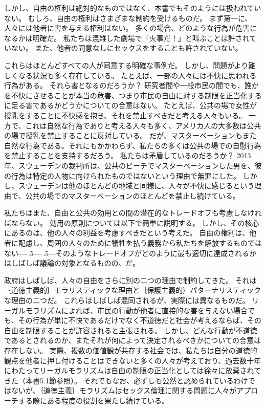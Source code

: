 \documentclass[paper=a4,book,openany]{jlreq}
\def\DDASH{―\kern-.5\zw―\kern-.5\zw―} %
\begin{document}
しかし、自由の権利は絶対的なものではなく、本書でもそのようには扱われていない。
むしろ、自由の権利はさまざまな制約を受けるものだ。
まず第一に、人々には他者に害を与える権利はない。
多くの場合、どのような行為が危害になるかは明確だ。
私たちは混雑した劇場で「火事だ！」と叫ぶことは許されていない。
また、他者の同意なしにセックスをすることも許されていない。

これらはほとんどすべての人が同意する明確な事例だ。
しかし、問題がより難しくなる状況も多く存在している。
たとえば、一部の人々には不快に思われる行為がある。
それら害となるのだろうか？ 研究者間や一般市民の間でも、誰かを不快にさせることが本当の危害、つまり市民の自由に対する制限を正当化するに足る害であるかどうかについての合意はない。
たとえば、公共の場で女性が授乳をすることに不快感を抱き、それを禁止すべきだと考える人々もいる。
一方で、これは自然な行為でありと考える人々も多く、アメリカ人の大多数は公共の場で授乳を禁止することに反対している\citep{cdc08:_public_opinion_breas}。
だが、マスターベーションもまた自然な行為である。それにもかかわらず、私たちの多くは公共の場での自慰行為を禁止することを支持するだろう。
私たちは矛盾しているのだろうか？ 2013年、スウェーデンの裁判所は、公共のビーチでマスターベーションした男を、彼の行為は特定の人物に向けられたものではないという理由で無罪にした\citep{ederyd13:_you_cant_just_walk_aroun}。
しかし、スウェーデンは他のほとんどの地域と同様に、人々が不快に感じるという理由で、公共の場でのマスターベーションのほとんどを禁止し続けている。

私たちはまた、自由と公共の効用との間の潜在的なトレードオフも考慮しなければならない。
効用の原則については以下で簡単に説明する。
しかし、その核心にあるのは、他の人々の利益を考慮すべきだという考えだ。
自由の権利は、他者に配慮し、周囲の人々のために犠牲を払う義務から私たちを解放するものではない{\DDASH}そのようなトレードオフがどのように最も適切に達成されるかはしばしば議論の対象となるものの、だ。

政府はしばしば、人々の自由をさらに別の二つの理由で制約してきた。
それは｛道徳主義的｝{モラリスティック}な理由と｛保護主義的｝{パターナリスティック}な理由の二つだ。
これらはしばしば混同されるが、実際には異なるものだ。
リーガルモラリズムによれば、市民の行動が他者に直接的な害を与えない場合でも、その行為が単に不快であるだけでなく不道徳だと社会が考えるならば、その自由を制限することが許容されると主張される。
しかし、どんな行動が不道徳であるとされるのか、またそれが何によって決定されるべきかについての合意は存在しない。
実際、複数の価値観が共存する社会では、私たちは自分の道徳的観点を他者に押し付けることはできないと多くの人々が考えており、過去数十年にわたってリーガルモラリズムは自由の制限の正当化としては徐々に放棄されてきた（本書5.1節参照）。
それでもなお、必ずしも公然と認められているわけではないが、｛道徳主義｝{モラリズム}はセックス倫理に関する問題に人々がアプローチする際にある程度の役割を果たし続けている。
\end{document}
